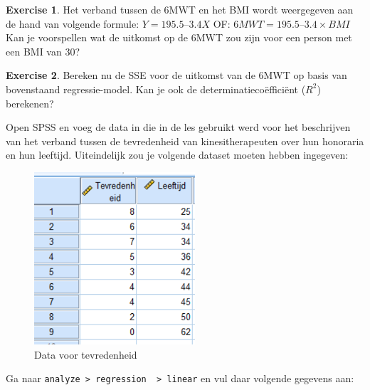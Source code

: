 \documentclass[
]{book}
\theoremstyle{definition}
\theoremstyle{definition}
\theoremstyle{definition}
\newtheorem{exercise}{Exercise}[chapter]
\theoremstyle{definition}
\theoremstyle{remark}
\begin{document}
\begin{exercise}
Het verband tussen de 6MWT en het BMI wordt weergegeven aan de hand van volgende formule: \(Y = 195.5 – 3.4X\) OF: \(6MWT = 195.5 – 3.4 \times BMI\) Kan je voorspellen wat de uitkomst op de 6MWT zou zijn voor een person met een BMI van 30?
\end{exercise}

\begin{exercise}
Bereken nu de SSE voor de uitkomst van de 6MWT op basis van bovenstaand regressie-model. Kan je ook de determinatiecoëfficiënt (\(R^2\)) berekenen?
\end{exercise}

Open SPSS en voeg de data in die in de les gebruikt werd voor het beschrijven van het verband tussen de tevredenheid van kinesitherapeuten over hun honoraria en hun leeftijd. Uiteindelijk zou je volgende dataset moeten hebben ingegeven:

\begin{figure}
\includegraphics[width=1\linewidth]{img/ex_spss_lm_1} \caption{Data voor tevredenheid}\label{fig:exspsslm1}
\end{figure}

Ga naar \texttt{analyze\ \textgreater{}\ regression\ \ \textgreater{}\ linear} en vul daar volgende gegevens aan:
\end{document}
